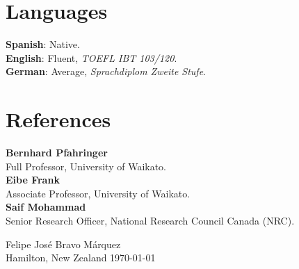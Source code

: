 \documentclass[letterpaper]{article}
\begin{document}
\section{Languages}
\begin{flushleft}
\textbf{Spanish}: Native.  \\
\textbf{English}: Fluent, \textit{TOEFL IBT 103/120}.   \\
\textbf{German}:  Average, \textit{Sprachdiplom Zweite Stufe}. \\ 
\end{flushleft}

\section{References}
\begin{flushleft}
\textbf{Bernhard Pfahringer} \\
Full Professor, University of Waikato. \\
\textbf{Eibe Frank} \\
Associate Professor, University of Waikato. \\
\textbf{Saif Mohammad}   \\
Senior Research Officer, National Research Council Canada (NRC). \\ 
\end{flushleft}


\begin{flushright}
Felipe José Bravo Márquez\\
Hamilton, New Zealand \today
\end{flushright}
\end{document}
